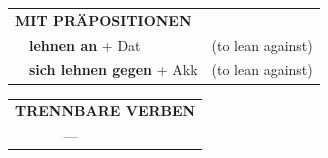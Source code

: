\documentclass[10pt,a4paper]{revtex4-2}
\begin{document}
\begin{verbbox}
\vspace{10pt}

\begin{tabular}{lll}
\multicolumn{3}{l}{\textbf{MIT PRÄPOSITIONEN}}\\
& \textbf{lehnen an} + Dat & (to lean against)\\
& \textbf{sich lehnen gegen} + Akk & (to lean against)\\
\end{tabular}
\hfill
\begin{tabular}{lll}
\multicolumn{3}{l}{\textbf{TRENNBARE VERBEN}}\\
& ---\\
\end{tabular}
\vspace{-5pt}
\end{verbbox}
\end{document}

